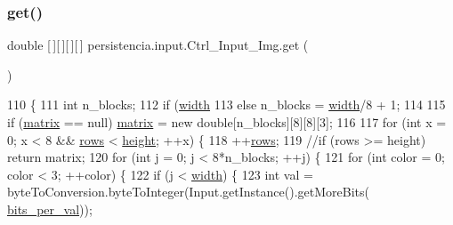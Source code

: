 \subsubsection{\texorpdfstring{get()}{get()}}
{\footnotesize\ttfamily double \mbox{[}$\,$\mbox{]}\mbox{[}$\,$\mbox{]}\mbox{[}$\,$\mbox{]}\mbox{[}$\,$\mbox{]} persistencia.\+input.\+Ctrl\+\_\+\+Input\+\_\+\+Img.\+get (\begin{DoxyParamCaption}{ }\end{DoxyParamCaption})\hspace{0.3cm}{\ttfamily [inline]}}


\begin{DoxyCode}
110     \{
111         \textcolor{keywordtype}{int} n\_blocks;
112         \textcolor{keywordflow}{if} (\hyperlink{classpersistencia_1_1input_1_1Ctrl__Input__Img_a51dd0b9243b854aa25ac4532acca4524}{width}%
113         \textcolor{keywordflow}{else} n\_blocks = \hyperlink{classpersistencia_1_1input_1_1Ctrl__Input__Img_a51dd0b9243b854aa25ac4532acca4524}{width}/8 + 1;
114 
115         \textcolor{keywordflow}{if} (\hyperlink{classpersistencia_1_1input_1_1Ctrl__Input__Img_ae61f4eb4fa38ea6dfb1e03f443711948}{matrix} == null) \hyperlink{classpersistencia_1_1input_1_1Ctrl__Input__Img_ae61f4eb4fa38ea6dfb1e03f443711948}{matrix} = \textcolor{keyword}{new} \textcolor{keywordtype}{double}[n\_blocks][8][8][3];
116 
117         \textcolor{keywordflow}{for} (\textcolor{keywordtype}{int} x = 0; x < 8 && \hyperlink{classpersistencia_1_1input_1_1Ctrl__Input__Img_a1288870f941a6730df2aadbb767f6e6f}{rows} < \hyperlink{classpersistencia_1_1input_1_1Ctrl__Input__Img_abc1dcc48714e9e74fb8ae0e0b81f91bf}{height}; ++x) \{
118             ++\hyperlink{classpersistencia_1_1input_1_1Ctrl__Input__Img_a1288870f941a6730df2aadbb767f6e6f}{rows};
119             \textcolor{comment}{//if (rows >= height) return matrix;}
120             \textcolor{keywordflow}{for} (\textcolor{keywordtype}{int} j = 0; j < 8*n\_blocks; ++j) \{
121                 \textcolor{keywordflow}{for} (\textcolor{keywordtype}{int} color = 0; color < 3; ++color) \{
122                     \textcolor{keywordflow}{if} (j < \hyperlink{classpersistencia_1_1input_1_1Ctrl__Input__Img_a51dd0b9243b854aa25ac4532acca4524}{width}) \{
123                         \textcolor{keywordtype}{int} val = byteToConversion.byteToInteger(Input.getInstance().getMoreBits(
      \hyperlink{classpersistencia_1_1input_1_1Ctrl__Input__Img_a222ad0e7d241e5f396cf67c3b760f143}{bits\_per\_val}));

\end{DoxyCode}
